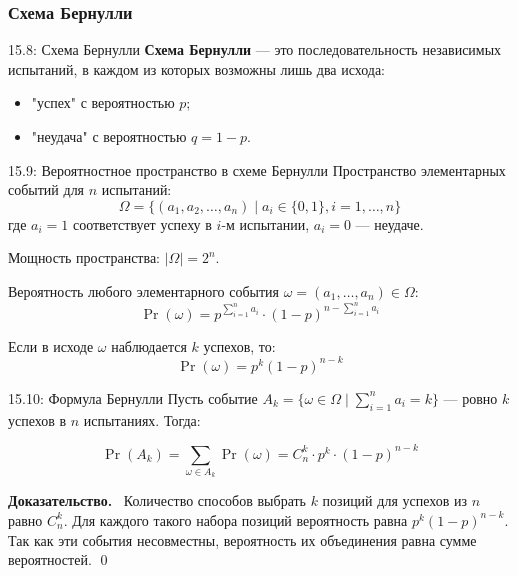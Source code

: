 \documentclass[a4paper,12pt]{article}
\newcommand{\myproof}{\textbf{Доказательство.}\ }
\begin{document}
	\subsubsection{Схема Бернулли}
	
	\begin{definitionbox}{15.8: Схема Бернулли}
		\textbf{Схема Бернулли} — это последовательность независимых испытаний, в каждом из которых возможны лишь два исхода:
		\begin{itemize}
			\item "успех" с вероятностью \(p\);
			\item "неудача" с вероятностью \(q = 1 - p\).
		\end{itemize}
	\end{definitionbox}
	
	\begin{definitionbox}{15.9: Вероятностное пространство в схеме Бернулли}
		Пространство элементарных событий для \(n\) испытаний:
		\[ \Omega = \{ (a_1, a_2, \dots, a_n) \mid a_i \in \{0, 1\}, i = 1, \dots, n \} \]
		где \(a_i = 1\) соответствует успеху в \(i\)-м испытании, \(a_i = 0\) — неудаче.
		
		Мощность пространства: \(|\Omega| = 2^n\).
		
		Вероятность любого элементарного события \(\omega = (a_1, \dots, a_n) \in \Omega\):
		\[ \Pr(\omega) = p^{\sum_{i=1}^n a_i} \cdot (1-p)^{n - \sum_{i=1}^n a_i} \]
		
		Если в исходе \(\omega\) наблюдается \(k\) успехов, то:
		\[ \Pr(\omega) = p^k (1-p)^{n-k} \]
	\end{definitionbox}
	
	\begin{theorembox}{15.10: Формула Бернулли}
		Пусть событие \(A_k = \{ \omega \in \Omega \mid \sum_{i=1}^n a_i = k \}\) — ровно \(k\) успехов в \(n\) испытаниях. Тогда:
		
		\[ \Pr(A_k) = \sum_{\omega \in A_k} \Pr(\omega) = C_n^k \cdot p^k \cdot (1-p)^{n-k} \]
	\end{theorembox}
	
	\myproof
	Количество способов выбрать \(k\) позиций для успехов из \(n\) равно \(C_n^k\). Для каждого такого набора позиций вероятность равна \(p^k (1-p)^{n-k}\). Так как эти события несовместны, вероятность их объединения равна сумме вероятностей. \qed
	
\end{document}
